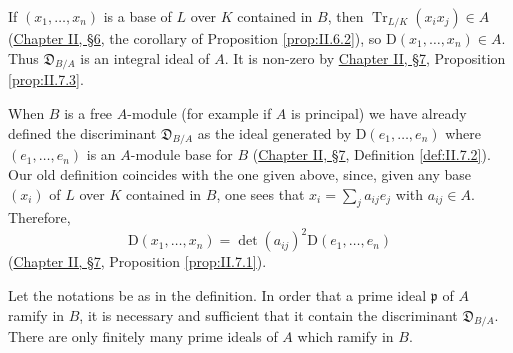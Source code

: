 \begin{remark}
\label{rem:V.3.1}
If $(x_{1},\ldots,x_{n})$ is a base of $L$ over $K$ contained in $B$, then
$\operatorname{Tr}_{L/K}(x_{i}x_{j})\in A$ (\hyperref[sec:2.6]{Chapter II, §6}, the corollary of
Proposition \ref{prop:II.6.2}), so $\mathrm{D}(x_{1},\ldots,x_{n})\in A$.
Thus $\mathfrak{D}_{B/A}$ is an integral ideal of $A$. It is non-zero by
\hyperref[sec:2.7]{Chapter II, §7}, Proposition \ref{prop:II.7.3}.
\end{remark}

\begin{remark}
\label{rem:V.3.2}
When $B$ is a free $A$-module (for example if $A$ is principal) we have
already defined the discriminant $\mathfrak{D}_{B/A}$ as the ideal generated
by $\mathrm{D}(e_{1},\ldots,e_{n})$ where $(e_{1},\ldots,e_{n})$ is an
$A$-module base for $B$ (\hyperref[sec:2.7]{Chapter II, §7}, Definition \ref{def:II.7.2}). Our
old definition coincides with the one given above, since, given any base
$(x_{i})$ of $L$ over $K$ contained in $B$, one sees that
$x_{i}=\sum_{j}a_{ij}e_{j}$ with $a_{ij}\in A$. Therefore,
\[
\mathrm{D}(x_{1},\ldots,x_{n})
=\det(a_{ij})^{2}\mathrm{D}(e_{1},\ldots,e_{n})
\]
(\hyperref[sec:2.7]{Chapter II, §7}, Proposition \ref{prop:II.7.1}).
\end{remark}

\begin{theorem}
\label{thm:V.3.1}
Let the notations be as in the definition. In order that a prime ideal
$\mathfrak{p}$ of $A$ ramify in $B$, it is necessary and sufficient that it
contain the discriminant $\mathfrak{D}_{B/A}$. There are only finitely many
prime ideals of $A$ which ramify in $B$.
\end{theorem}


